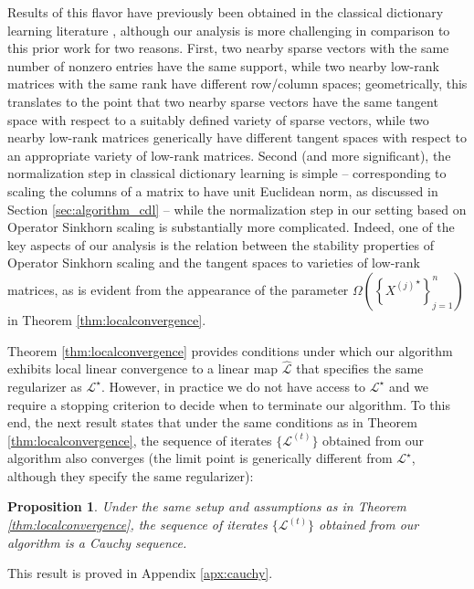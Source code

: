 \documentclass[11pt,letterpaper]{article}
\newtheorem{proposition}[theorem]{Proposition}
\renewcommand{\L}{\mathcal{L}}
\begin{document}
Results of this flavor have previously been obtained in the classical dictionary learning literature \cite{AAJN:16,AGTM:15}, although our analysis is more challenging in comparison to this prior work for two reasons.  First, two nearby sparse vectors with the same number of nonzero entries have the same support, while two nearby low-rank matrices with the same rank have different row/column spaces; geometrically, this translates to the point that two nearby sparse vectors have the same tangent space with respect to a suitably defined variety of sparse vectors, while two nearby low-rank matrices generically have different tangent spaces with respect to an appropriate variety of low-rank matrices.  Second (and more significant), the normalization step in classical dictionary learning is simple -- corresponding to scaling the columns of a matrix to have unit Euclidean norm, as discussed in Section \ref{sec:algorithm_cdl} -- while the normalization step in our setting based on Operator Sinkhorn scaling is substantially more complicated.  Indeed, one of the key aspects of our analysis is the relation between the stability properties of Operator Sinkhorn scaling and the tangent spaces to varieties of low-rank matrices, as is evident from the appearance of the parameter $\Omega\left(\left\{{X^{(j)}}^\star \right\}_{j=1}^n\right)$ in Theorem \ref{thm:localconvergence}.


Theorem \ref{thm:localconvergence} provides conditions under which our algorithm exhibits local linear convergence to a linear map $\hat{\L}$ that specifies the same regularizer as $\L^\star$.  However, in practice we do not have access to $\L^\star$ and we require a stopping criterion to decide when to terminate our algorithm.  To this end, the next result states that under the same conditions as in Theorem \ref{thm:localconvergence}, the sequence of iterates $\{\L^{(t)}\}$ obtained from our algorithm also converges (the limit point is generically different from $\L^\star$, although they specify the same regularizer):

\begin{proposition} \label{thm:cauchy}
Under the same setup and assumptions as in Theorem \ref{thm:localconvergence}, the sequence of iterates $\{\L^{(t)}\}$ obtained from our algorithm is a Cauchy sequence.
\end{proposition}

This result is proved in Appendix \ref{apx:cauchy}.
\end{document}
